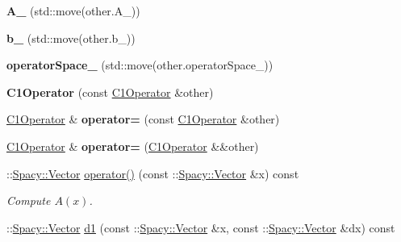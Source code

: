 \begin{DoxyCompactItemize}
\item 
\hypertarget{classSpacy_1_1FEniCS_1_1C1Operator_acb2df6d413ebce7c46fd5f51647760dc}{{\bfseries A\-\_\-} (std\-::move(other.\-A\-\_\-))}\label{classSpacy_1_1FEniCS_1_1C1Operator_acb2df6d413ebce7c46fd5f51647760dc}

\item 
\hypertarget{classSpacy_1_1FEniCS_1_1C1Operator_a90c353a5a884d890aea6066b9d77f716}{{\bfseries b\-\_\-} (std\-::move(other.\-b\-\_\-))}\label{classSpacy_1_1FEniCS_1_1C1Operator_a90c353a5a884d890aea6066b9d77f716}

\item 
\hypertarget{classSpacy_1_1FEniCS_1_1C1Operator_a852bcd48c30d3998ccacdf9d5db8d3d8}{{\bfseries operator\-Space\-\_\-} (std\-::move(other.\-operator\-Space\-\_\-))}\label{classSpacy_1_1FEniCS_1_1C1Operator_a852bcd48c30d3998ccacdf9d5db8d3d8}

\item 
\hypertarget{classSpacy_1_1FEniCS_1_1C1Operator_a8bedc9295f43ebe21be9e2a9337da1e5}{{\bfseries C1\-Operator} (const \hyperlink{classSpacy_1_1FEniCS_1_1C1Operator}{C1\-Operator} \&other)}\label{classSpacy_1_1FEniCS_1_1C1Operator_a8bedc9295f43ebe21be9e2a9337da1e5}

\item 
\hypertarget{classSpacy_1_1FEniCS_1_1C1Operator_a1e74d332b9cb30ed83d757a39453c47c}{\hyperlink{classSpacy_1_1FEniCS_1_1C1Operator}{C1\-Operator} \& {\bfseries operator=} (const \hyperlink{classSpacy_1_1FEniCS_1_1C1Operator}{C1\-Operator} \&other)}\label{classSpacy_1_1FEniCS_1_1C1Operator_a1e74d332b9cb30ed83d757a39453c47c}

\item 
\hypertarget{classSpacy_1_1FEniCS_1_1C1Operator_ae611721c1f172413877c91a3e99ae69b}{\hyperlink{classSpacy_1_1FEniCS_1_1C1Operator}{C1\-Operator} \& {\bfseries operator=} (\hyperlink{classSpacy_1_1FEniCS_1_1C1Operator}{C1\-Operator} \&\&other)}\label{classSpacy_1_1FEniCS_1_1C1Operator_ae611721c1f172413877c91a3e99ae69b}

\item 
\hypertarget{classSpacy_1_1FEniCS_1_1C1Operator_a5e2b3831a7583793f6c134eedd2be9bc}{\-::\hyperlink{classSpacy_1_1Vector}{Spacy\-::\-Vector} \hyperlink{classSpacy_1_1FEniCS_1_1C1Operator_a5e2b3831a7583793f6c134eedd2be9bc}{operator()} (const \-::\hyperlink{classSpacy_1_1Vector}{Spacy\-::\-Vector} \&x) const }\label{classSpacy_1_1FEniCS_1_1C1Operator_a5e2b3831a7583793f6c134eedd2be9bc}

\begin{DoxyCompactList}\small\item\em Compute $A(x)$. \end{DoxyCompactList}\item 
\hypertarget{classSpacy_1_1FEniCS_1_1C1Operator_a610d7a4a5daec3b512ab3ccf46a7b9e9}{\-::\hyperlink{classSpacy_1_1Vector}{Spacy\-::\-Vector} \hyperlink{classSpacy_1_1FEniCS_1_1C1Operator_a610d7a4a5daec3b512ab3ccf46a7b9e9}{d1} (const \-::\hyperlink{classSpacy_1_1Vector}{Spacy\-::\-Vector} \&x, const \-::\hyperlink{classSpacy_1_1Vector}{Spacy\-::\-Vector} \&dx) const }\label{classSpacy_1_1FEniCS_1_1C1Operator_a610d7a4a5daec3b512ab3ccf46a7b9e9}


\end{DoxyCompactItemize}
